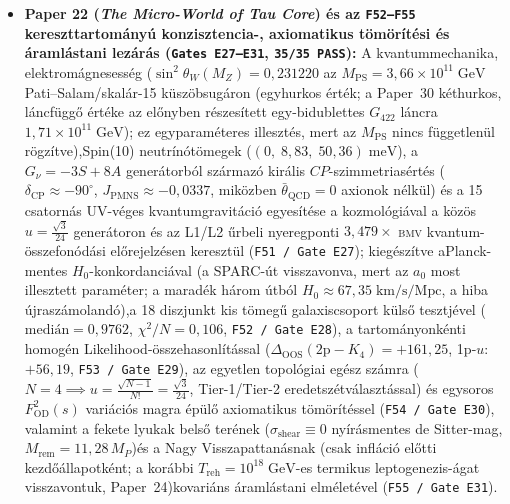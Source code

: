 \documentclass[11pt,a4paper]{article}
\begin{document}
\begin{itemize}[leftmargin=1.5em]
\item \textbf{Paper 22 (\emph{The Micro-World of Tau Core}) és az \texttt{F52--F55} kereszttartományú konzisztencia-, axiomatikus tömörítési és áramlástani lezárás (\texttt{Gates E27--E31}, \texttt{35/35 PASS}):} A kvantummechanika, elektromágnesesség ($\sin^2\theta_W(M_Z) = 0{,}231220$ az $M_{\mathrm{PS}} = 3{,}66\times 10^{11}\;\mathrm{GeV}$Pati--Salam/\allowbreak skal\'ar-15 k\"usz\"obsug\'aron (egyhurkos \'ert\'ek; a Paper~30 k\'ethurkos, l\'ancf\"ugg\H{o} \'ert\'eke az el\H{o}nyben r\'eszes\'itett egy-bidublettes $G_{422}$ l\'ancra $1{,}71\times 10^{11}\;\mathrm{GeV}$); ez egyparam\'eteres illeszt\'es, mert az $M_{\mathrm{PS}}$ nincs f\"uggetlen\"ul r\"ogz\'itve),\textrm{Spin}(10) neutrínótömegek ($(0,\;8{,}83,\;50{,}36)\;\mathrm{meV}$), a $G_\nu = -3S + 8A$ generátorból származó királis $CP$-szimmetriasértés ($\delta_{\mathrm{CP}} \approx -90^\circ$, $J_{\mathrm{PMNS}} \approx -0{,}0337$, miközben $\bar{\theta}_{\mathrm{QCD}} = 0$ axionok nélkül) és a 15 csatornás UV-véges kvantumgravitáció egyesítése a kozmológiával a közös $u = \frac{\sqrt{3}}{24}$ generátoron és az L1/L2 \H{u}rbeli nyeregponti $3{,}479\times$ \textsc{bmv} kvantum-összefonódási el\H{o}rejelzésen keresztül (\texttt{F51 / Gate E27}); kiegészítve aPlanck-mentes $H_0$-konkordanci\'aval (a SPARC-\'ut visszavonva, mert az $a_0$ most illesztett param\'eter; a marad\'ek h\'arom \'utb\'ol $H_0\approx 67{,}35\;\mathrm{km/s/Mpc}$, a hiba \'ujrasz\'amoland\'o),a 18 diszjunkt kis tömeg\H{u} galaxiscsoport küls\H{o} tesztjével ($\mathrm{medián} = 0{,}9762$, $\chi^2/N = 0{,}106$, \texttt{F52 / Gate E28}), a tartományonkénti homogén Likelihood-összehasonlítással ($\Delta_{\mathrm{OOS}}(2\mathrm{p}-K_4)=+161{,}25$, 1p-$u$: $+56{,}19$, \texttt{F53 / Gate E29}), az egyetlen topológiai egész számra ($N=4 \implies u=\frac{\sqrt{N-1}}{N!}=\frac{\sqrt{3}}{24}$, Tier-1/Tier-2 eredetszétválasztással) és egysoros $F_{\mathrm{OD}}^2(s)$ variációs magra épül\H{o} axiomatikus tömörítéssel (\texttt{F54 / Gate E30}), valamint a fekete lyukak bels\H{o} terének ($\sigma_{\mathrm{shear}}\equiv 0$ nyírásmentes de Sitter-mag, $M_{\mathrm{rem}}=11{,}28\,M_P$)\'es a Nagy Visszapattan\'asnak (csak infl\'aci\'o el\H{o}tti kezd\H{o}\'allapotk\'ent; a kor\'abbi $T_{\mathrm{reh}}=10^{18}\;\mathrm{GeV}$-es termikus leptogenezis-\'agat visszavontuk, Paper~24)kovariáns áramlástani elméletével (\texttt{F55 / Gate E31}).

\end{itemize}
\end{document}
